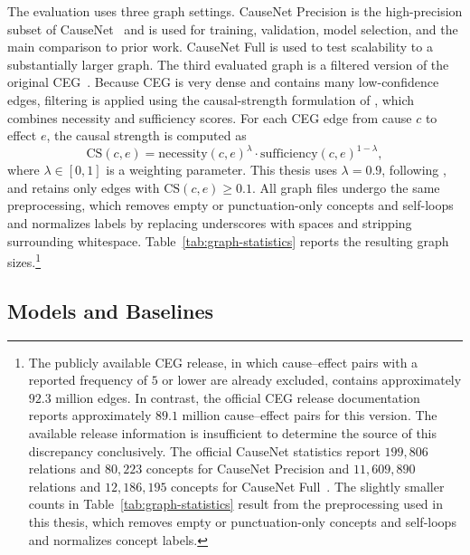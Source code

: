 The evaluation uses three graph settings. CauseNet Precision is the high-precision subset of CauseNet~\citep{heindorf:2020} and is used for training, validation, model selection, and the main comparison to prior work. CauseNet Full is used to test scalability to a substantially larger graph. The third evaluated graph is a filtered version of the original CEG~\citep{li:2020}. Because CEG is very dense and contains many low-confidence edges, filtering is applied using the causal-strength formulation of \citet{luo:2016}, which combines necessity and sufficiency scores. For each CEG edge from cause \(c\) to effect \(e\), the causal strength is computed as
\[
    \mathrm{CS}(c,e)
    =
    \mathrm{necessity}(c,e)^{\lambda}
    \cdot
    \mathrm{sufficiency}(c,e)^{1-\lambda},
\]
where \(\lambda\in[0,1]\) is a weighting parameter. This thesis uses \(\lambda = 0.9\), following \citeauthor{luo:2016}, and retains only edges with \(\mathrm{CS}(c,e) \geq 0.1\). All graph files undergo the same preprocessing, which removes empty or punctuation-only concepts and self-loops and normalizes labels by replacing underscores with spaces and stripping surrounding whitespace. Table~\ref{tab:graph-statistics} reports the resulting graph sizes.\footnote{The publicly available CEG release, in which cause--effect pairs with a reported frequency of \(5\) or lower are already excluded, contains approximately \(92.3\) million edges. In contrast, the official CEG release documentation~\citep{li:2020} reports approximately \(89.1\) million cause--effect pairs for this version. The available release information is insufficient to determine the source of this discrepancy conclusively. The official CauseNet statistics report \(199{,}806\) relations and \(80{,}223\) concepts for CauseNet Precision and \(11{,}609{,}890\) relations and \(12{,}186{,}195\) concepts for CauseNet Full~\citep{heindorf:2020}. The slightly smaller counts in Table~\ref{tab:graph-statistics} result from the preprocessing used in this thesis, which removes empty or punctuation-only concepts and self-loops and normalizes concept labels.}



\subsection{Models and Baselines}
\label{sec:results-models}

